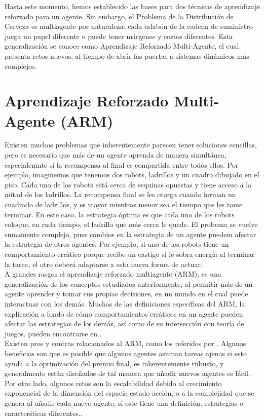 Hasta este momento, hemos establecido las bases para dos t\'ecnicas de aprendizaje reforzado para un agente. Sin embargo, el Problema de la Distribución de Cerveza es multiagente por naturaleza: cada eslab\'on de la cadena de suministro juega un papel diferente o puede tener m\'argenes y costos diferentes. Esta generalizaci\'on se conoce como Aprendizaje Reforzado Multi-Agente, el cual presenta retos nuevos, al tiempo de abrir las puertas a sistemas din\'amicos m\'as complejos.

\section{Aprendizaje Reforzado Multi-Agente (ARM)}

Existen muchos problemas que inherentemente parecen tener soluciones sencillas, pero es necesario que m\'as de un agente aprenda de manera simult\'anea, especialemnte si la recompensa al final es compartida entre todos ellos. Por ejemplo, imaginemos que tenemos dos robots, ladrillos y un cuadro dibujado en el piso. Cada uno de los robots est\'a cerca de esquinas opuestas y tiene acceso a la mitad de los ladrillos. La recompensa final se les otorga cuando forman un cuadrado de ladrillos, y es mayor mientras menor sea el tiempo que les tome terminar. En este caso, la estrategia \'optima es que cada uno de los robots coloque, en cada tiempo, el ladrillo que m\'as cerca le quede. El probema se vuelve sumamente complejo, pues cambios en la estrategia de un agente puedem afectar la estrategia de otros agentes. Por ejemplo, si uno de los robots tiene un comportamiento err\'atico porque recibe un castigo si le sobra energ\'ia al terminar la tarea, el otro deber\'a adaptarse a esta nueva forma de actuar.\\

A grandes rasgos el aprendizaje reforzado multiagente (ARM), es una generalizaci\'on de los conceptos estudiados anteriormente, al permitir m\'as de un agente aprender y tomar sus propias decisiones, en un mundo en el cual puede interactuar con los dem\'as. Muchas de las definiciones espec\'ificas del ARM, la explicaci\'on a fondo de c\'omo comportamientos err\'aticos en un agente pueden afectar las estrategias de los dem\'as, as\'i como de su intersecci\'on con teor\'ia de juegos, pueden encontrarse en \citet{Bloembergen}. \\

Existen pros y contras relacionados al ARM, como los referidos por \citet{Busoniu}. Algunos beneficios son que es posible que algunos agentes asuman tareas ajenas si esto ayuda a la optimizaci\'on del premio final, es inherentemente rubusto, y generalmente est\'an dise\~nados de tal manera que a\~nadir nuevos agentes es f\'acil. Por otro lado, algunos retos son la escalabilidad debido al crecimiento exponencial de la dimensi\'on del espacio estado-acci\'on, o a la complejidad que se genera al a\~nadir cada nuevo agente, si este tiene una definici\'on, estrategias o caracter\'sticas diferentes..\\

